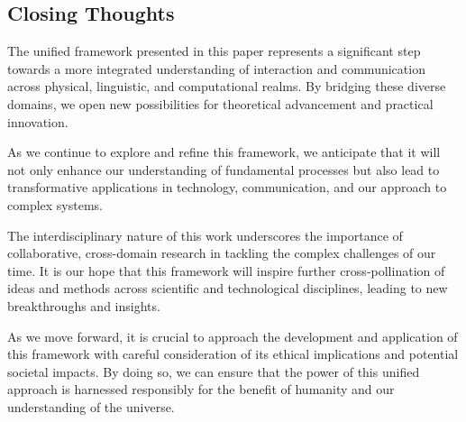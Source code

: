 \subsection{Closing Thoughts}

The unified framework presented in this paper represents a significant step towards a more integrated understanding of interaction and communication across physical, linguistic, and computational realms. By bridging these diverse domains, we open new possibilities for theoretical advancement and practical innovation.

As we continue to explore and refine this framework, we anticipate that it will not only enhance our understanding of fundamental processes but also lead to transformative applications in technology, communication, and our approach to complex systems.

The interdisciplinary nature of this work underscores the importance of collaborative, cross-domain research in tackling the complex challenges of our time. It is our hope that this framework will inspire further cross-pollination of ideas and methods across scientific and technological disciplines, leading to new breakthroughs and insights.

As we move forward, it is crucial to approach the development and application of this framework with careful consideration of its ethical implications and potential societal impacts. By doing so, we can ensure that the power of this unified approach is harnessed responsibly for the benefit of humanity and our understanding of the universe.